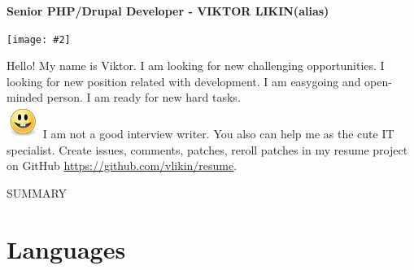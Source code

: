\documentclass[11pt]{article}
\newcommand{\header}[3]{
	\begin{center} \bfseries \large
		{#1} \\
	\end{center}
	\begin{minipage}{0.3\textwidth}
		\begin{flushleft}
			\texttt{[image: \#2]}
		\end{flushleft}
	\end{minipage}	
	\begin{minipage}{0.7\textwidth}
		\begin{flushleft} \large
			{#3} \\
		\end{flushleft}
	\end{minipage}
}
\begin{document}
	\header
		{Senior PHP/Drupal Developer - VIKTOR LIKIN(alias)}
		{./face.png} 
		{Hello! My name is Viktor. I am looking for new challenging opportunities. I looking for new position related with development. I am easygoing and open-minded person. I am ready for new hard tasks.\\
		\includegraphics[scale=0.7]{./smile.png} I am not a good interview writer. You also can help me as the cute IT specialist. Create issues, comments, patches, reroll patches in my resume project on GitHub \url{https://github.com/vlikin/resume}.}
		


	\begin{center}
 		SUMMARY \\ \Large
	\end{center}
	\section*{Languages}
\end{document}
